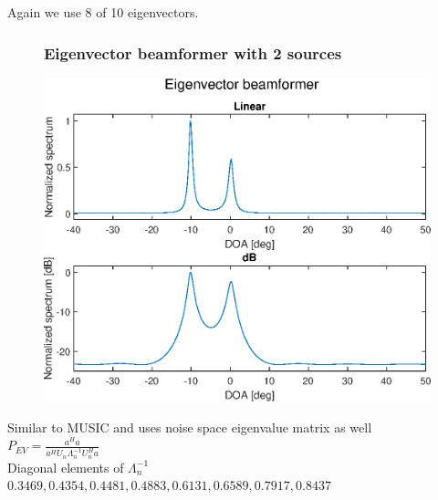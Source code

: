 \documentclass{beamer}
\begin{document}
\begin{frame}
	Again we use 8 of 10 eigenvectors.
	\begin{figure}
    	\frametitle{Eigenvector beamformer with 2 sources}
		\centering
    	\includegraphics[scale=0.4]{EV.eps}\\	
	\end{figure}
    Similar to MUSIC and uses noise space eigenvalue matrix as well\\
    $P_{EV} = \frac{a^H a}{a^H U_n \Lambda_n^{-1} U^H_n a}$\\
    Diagonal elements of $\Lambda_n^{-1}$\\ 
    $0.3469, 0.4354, 0.4481, 0.4883, 0.6131, 0.6589, 0.7917, 0.8437$
\end{frame}
\end{document}
